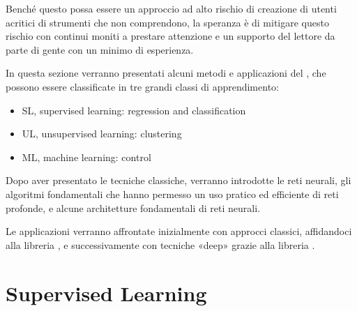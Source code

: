 \documentclass[letterpaper,10pt,italian]{jupyterBook}
\begin{document}
\sphinxAtStartPar
Benché questo possa essere un approccio ad alto rischio di creazione di utenti acritici di strumenti che non comprendono, la speranza è di mitigare questo rischio con continui moniti a prestare attenzione e un supporto del lettore da parte di gente con un minimo di esperienza.

\sphinxAtStartPar
{} In questa sezione verranno presentati alcuni metodi e applicazioni del , che possono essere classificate in tre grandi classi di apprendimento:
\begin{itemize}
\item {} 
\sphinxAtStartPar
SL, supervised learning: regression and classification

\item {} 
\sphinxAtStartPar
UL, unsupervised learning: clustering

\item {} 
\sphinxAtStartPar
ML, machine learning: control

\end{itemize}

\sphinxAtStartPar
Dopo aver presentato le tecniche classiche, verranno introdotte le reti neurali, gli algoritmi fondamentali che hanno permesso un uso pratico ed efficiente di reti profonde, e alcune architetture fondamentali di reti neurali.

\sphinxAtStartPar
Le applicazioni verranno affrontate inizialmente con approcci classici, affidandoci alla libreria , e successivamente con tecniche «deep» grazie alla libreria .

\sphinxstepscope


\chapter{Supervised Learning}
\label{\detokenize{ch/ai/sl:supervised-learning}}\label{\detokenize{ch/ai/sl:ai-sl}}\label{\detokenize{ch/ai/sl::doc}}
\sphinxstepscope
\end{document}
